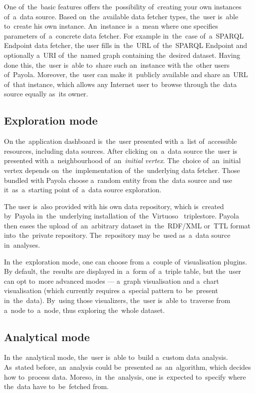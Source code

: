 One of~the~basic features offers the~possibility of~creating your own instances of~a~data source. Based on~the~available data fetcher types, the~user is~able to~create 
his own instance. An~instance is~a~mean where one specifies parameters of~a~concrete data fetcher. For example in~the~case of~a~SPARQL Endpoint data fetcher,
the user fills in~the~URL of~the~SPARQL Endpoint and optionally a~URI of~the~named graph 
containing the~desired dataset. Having done this, the~user is~able to~share 
such an~instance with the~other users of~Payola.
Moreover, the~user can make it~publicly available and share an~URL of~that instance, which allows any 
Internet user to~browse through the~data source equally as~its owner.

\subsection{Exploration mode}
On the~application dashboard is~the~user presented with a~list of~accessible 
resources, including data sources. After clicking on~a~data source the~user is
presented with a~neighbourhood of~an~\emph{initial vertex}. The~choice of~an~initial vertex
depends on~the~implementation of~the~underlying data fetcher.
Those bundled with Payola choose a~random entity from the~data source
and use it~as~a~starting point of~a~data source exploration.

The user is~also provided with his own data repository, which is~created by~Payola in~the~underlying installation of~the~Virtuoso~\cite{virtuoso} triplestore. Payola then eases 
the upload of~an~arbitrary dataset in~the~RDF/XML or~TTL 
format into~the~private repository. The~repository may be~used as~a~data source in~analyses.

In the~exploration mode, one can choose from a~couple of~visualisation plugins. 
By default, the~results are displayed in~a~form of~a~triple table, but the~user can 
opt to~more advanced modes --- a~graph visualisation and a~chart visualisation
(which currently requires a~special pattern to~be~present in~the~data). By~using those 
visualizers, the~user is~able to~traverse from a~node to~a~node, thus exploring the~whole 
dataset.

\subsection{Analytical mode}
In the~analytical mode, the~user is~able to~build a~custom data analysis. As~stated before, an~analysis could be~presented as~an~algorithm, which decides 
how to~process data. Moreso, in~the~analysis, one is~expected to~specify 
where the~data have to~be~fetched from.

